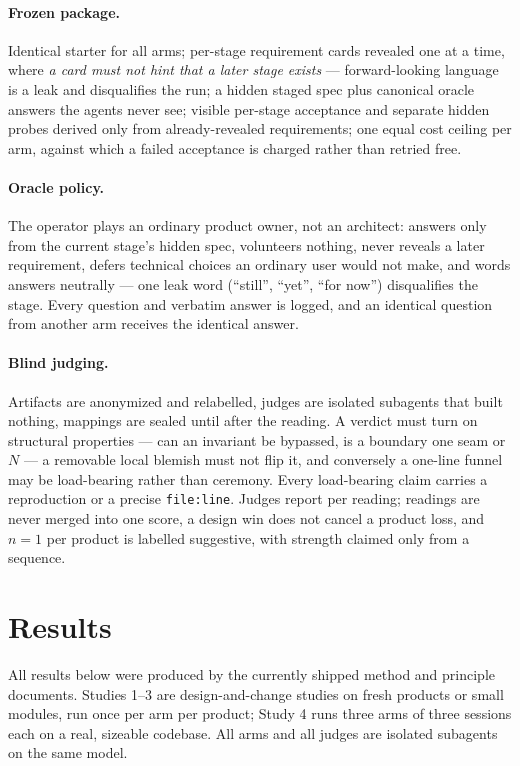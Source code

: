 \documentclass[11pt]{article}
\begin{document}
\paragraph{Frozen package.} Identical starter for all arms; per-stage requirement cards revealed one at a time, where \emph{a card must not hint that a later stage exists} --- forward-looking language is a leak and disqualifies the run; a hidden staged spec plus canonical oracle answers the agents never see; visible per-stage acceptance and separate hidden probes derived only from already-revealed requirements; one equal cost ceiling per arm, against which a failed acceptance is charged rather than retried free.

\paragraph{Oracle policy.} The operator plays an ordinary product owner, not an architect: answers only from the current stage's hidden spec, volunteers nothing, never reveals a later requirement, defers technical choices an ordinary user would not make, and words answers neutrally --- one leak word (``still'', ``yet'', ``for now'') disqualifies the stage. Every question and verbatim answer is logged, and an identical question from another arm receives the identical answer.

\paragraph{Blind judging.} Artifacts are anonymized and relabelled, judges are isolated subagents that built nothing, mappings are sealed until after the reading. A verdict must turn on structural properties --- can an invariant be bypassed, is a boundary one seam or $N$ --- a removable local blemish must not flip it, and conversely a one-line funnel may be load-bearing rather than ceremony. Every load-bearing claim carries a reproduction or a precise \texttt{file:line}. Judges report per reading; readings are never merged into one score, a design win does not cancel a product loss, and $n=1$ per product is labelled suggestive, with strength claimed only from a sequence.

\section{Results}
\label{sec:results}

All results below were produced by the currently shipped method and principle documents. Studies 1--3 are design-and-change studies on fresh products or small modules, run once per arm per product; Study 4 runs three arms of three sessions each on a real, sizeable codebase. All arms and all judges are isolated subagents on the same model.
\end{document}
